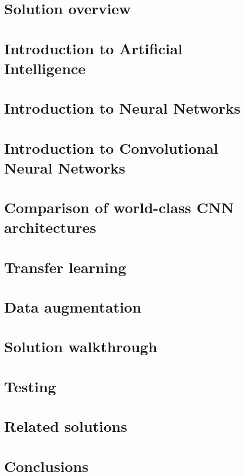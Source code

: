 \documentclass[11pt]{article}
\begin{document}
\section{Solution overview}
\clearpage

\section{Introduction to Artificial Intelligence}
\clearpage

\section{Introduction to Neural Networks}
\clearpage

\section{Introduction to Convolutional Neural Networks}
\clearpage

\section{Comparison of world-class CNN architectures}
\clearpage

\section{Transfer learning}
\clearpage

\section{Data augmentation}
\clearpage

\section{Solution walkthrough}
\clearpage

\section{Testing}
\clearpage

\section{Related solutions}
\clearpage

\section{Conclusions}
\clearpage



\end{document}
